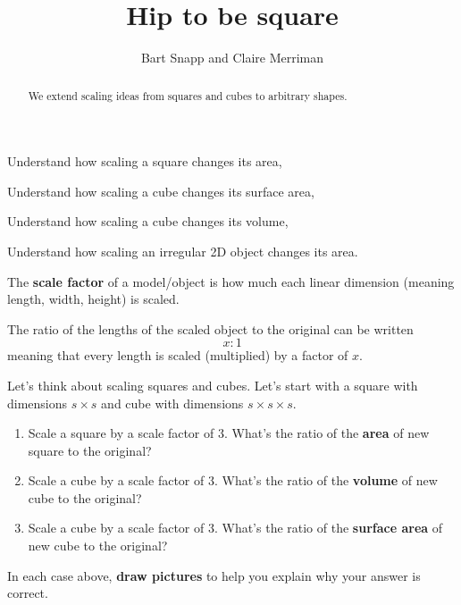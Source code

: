 \documentclass[handout,nooutcomes,noauthor,hints]{ximera}
\title{Hip to be square}
\author{Bart Snapp and Claire Merriman}
\begin{document}
\begin{abstract}
  We extend scaling ideas from squares and cubes to arbitrary shapes.
\end{abstract}
\maketitle

\begin{listOutcomes}
\item Understand how scaling a square changes its area,
\item Understand how scaling a cube changes its surface area,
\item Understand how scaling a cube changes its volume,
\item Understand how scaling an irregular 2D object changes its area.
\end{listOutcomes}



\begin{definition}
 The \textbf{scale factor} of a model/object is how much each linear
 dimension (meaning length, width, height) is scaled.


 The ratio of the lengths of the scaled object to the original can be written
 \[
x:1
 \]
 meaning that every length is scaled (multiplied) by a factor of $x$.
\end{definition}

\mynewpage

\begin{question}
  Let's think about scaling squares and cubes. Let's start with a
  square with dimensions $s\times s$ and cube with dimensions $s\times
  s\times s$.
  \begin{enumerate}
  \item Scale a square by a scale factor of $3$. What's the ratio of the \textbf{area} of new square to the original?
  \item Scale a cube by a scale factor of $3$. What's the ratio of the \textbf{volume} of new cube to the original?
  \item Scale a cube by a scale factor of $3$. What's the ratio of the \textbf{surface area} of new cube to the original?
  \end{enumerate}
  In each case above, \textbf{draw pictures} to help you explain why
  your answer is correct.
\end{question}
\mynewpage
\end{document}
